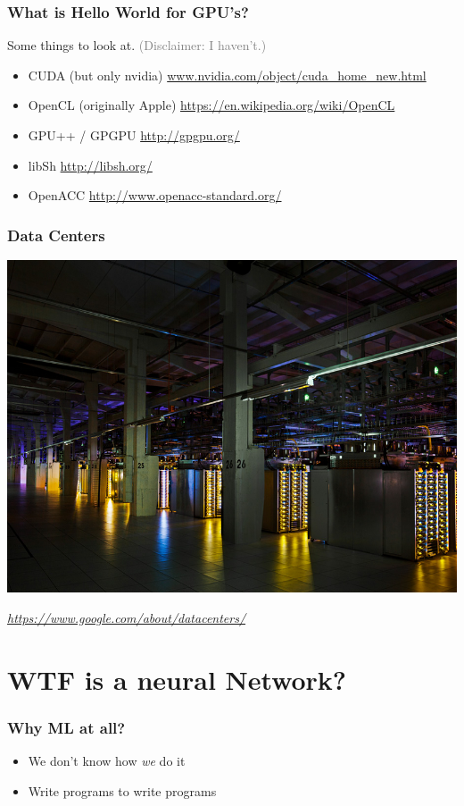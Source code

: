 \documentclass[t]{beamer}
\newcommand\gray[1]{\textcolor{gray}{#1}}
\newcommand\smallgray[1]{\textcolor{gray}{\small\it #1}}
\newcommand\prevwork[1]{\smallgray{#1}}
\begin{document}
\begin{frame}
  \frametitle{What is Hello World for GPU's?}
  Some things to look at.  \gray{(Disclaimer: I haven't.)}
  \begin{itemize}
  \item CUDA (but only nvidia) \hspace{3mm}\gray{\url{www.nvidia.com/object/cuda_home_new.html}}
  \item OpenCL (originally Apple) \hspace{3mm}\gray{\url{https://en.wikipedia.org/wiki/OpenCL}}
  \item GPU++ / GPGPU \hspace{3mm}\gray{\url{http://gpgpu.org/}}
  \item libSh \hspace{3mm}\gray{\url{http://libsh.org/}}
  \item OpenACC \hspace{3mm}\gray{\url{http://www.openacc-standard.org/}}
  \end{itemize}
\end{frame}

\begin{frame}
  \frametitle{Data Centers}
  \includegraphics[width=.9\textwidth]{google-dc.png}

  \prevwork{\url{https://www.google.com/about/datacenters/}}
\end{frame}

\section{WTF is a neural Network?}

\begin{frame}
  \frametitle{Why ML at all?}
  \begin{itemize}
  \item We don't know how \textit{we} do it
  \item Write programs to write programs
  \end{itemize}
\end{frame}
\end{document}
